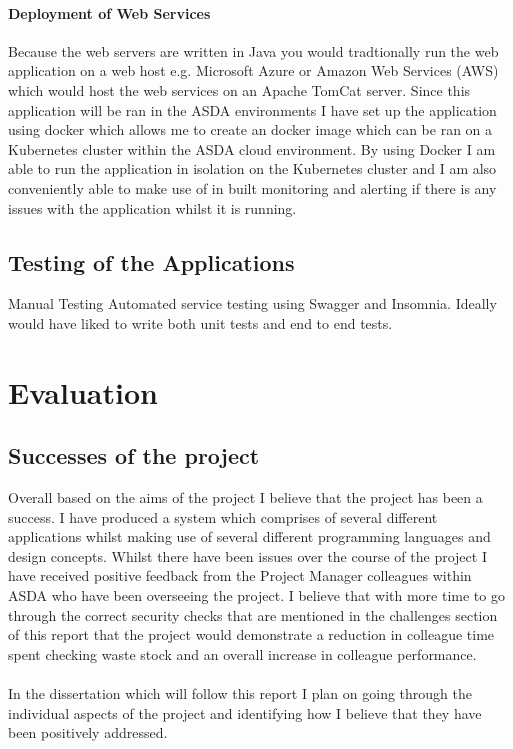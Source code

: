 \documentclass[a4paper,11pt]{report}
\begin{document}
\subsubsection{Deployment of Web Services}
Because the web servers are written in Java you would tradtionally run the web application on a web host e.g. Microsoft Azure or Amazon Web Services (AWS) which would host the web services on an Apache TomCat server. Since this application will be ran in the ASDA environments I have set up the application using docker which allows me to create an docker image which can be ran on a Kubernetes cluster within the ASDA cloud environment. 
By using Docker I am able to run the application in isolation on the Kubernetes cluster and I am also conveniently able to make use of in built monitoring and alerting if there is any issues with the application whilst it is running. 


\section{Testing of the Applications}
Manual Testing
Automated service testing using Swagger and Insomnia.
Ideally would have liked to write both unit tests and end to end tests.

\chapter{Evaluation}
\section {Successes of the project}
Overall based on the aims of the project I believe that the project has been a success. I have produced a system which comprises of several different applications whilst making use of several different programming languages and design concepts. 
 Whilst there have been issues over the course of the project I have received positive feedback from the Project Manager colleagues within ASDA who have been overseeing the project.
I believe that with more time to go through the correct security checks that are mentioned in the challenges section of this report that the project would demonstrate a reduction in 
colleague time spent checking waste stock and an overall increase in colleague performance. 
\\
\\
In the dissertation which will follow this report I plan on going through the individual aspects of the project and identifying how I believe that they have been positively addressed.
\end{document}
